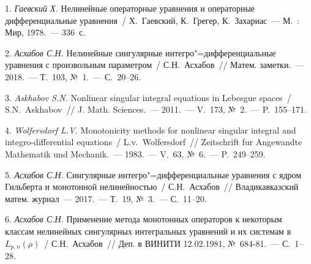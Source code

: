 1. {\it Гаевский Х.} Нелинейные операторные уравнения и операторные дифференциальные уравнения~/ Х.~Гаевский, К.~Грегер, К.~Захариас~--- М.~: Мир, 1978.~--- 336~с.

2. {\it Асхабов С.Н.} Нелинейные сингулярные интегро"=дифференциальные уравнения с произвольным параметром~/ С.Н.~Асхабов~// Матем. заметки.~--- 2018.~--- Т.~103, №~1.~--- С.~20--26.


3. {\it Askhabov S.N.} Nonlinear singular integral equations in Lebesgue spaces~/ S.N.~Askhabov~// J. Math. Sciences.~--- 2011.~--- V.~173, №~2.~--- P.~155--171.

4. {\it Wolfersdorf L.V.} Monotonicity methods for nonlinear singular integral and integro-differential equations~/ L.v.~Wolfersdorf~// Zeitschrift
fur Angewandte Mathematik und Mechanik.~--- 1983.~--- V.~63, №~6.~--- P.~249--259.


5. {\it Асхабов С.Н.} Сингулярные интегро"=дифференциальные уравнения с ядром Гильберта и монотонной нелинейностью~/ С.Н.~Асхабов~// Владикавказский матем. журнал~--- 2017.~--- Т.~19, №~3.~--- С.~11--20.

6. {\it Асхабов С.Н.} Применение метода монотонных операторов к некоторым классам нелинейных сингулярных интегральных уравнений и их системам в $L_{p,n}(\rho)$~/ С.Н.~Асхабов~// Деп. в ВИНИТИ 12.02.1981, №~684-81.~--- С.~1--28.
